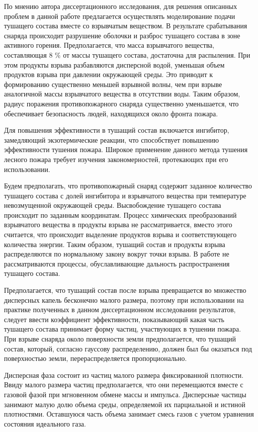 По мнению автора диссертационного исследования, для решения описанных проблем в данной работе предлагается
осуществлять моделирование подачи тушащего состава вместе со взрывчатым веществом.
В результате срабатывания снаряда происходит разрушение оболочки и разброс тушащего состава в зоне активного
горения.
Предполагается, что масса взрывчатого вещества, составляющая 8 \% от массы тушащего состава, достаточна для
распыления.
При этом продукты взрыва разбавляются дисперсной водой, уменьшая объем продуктов взрыва при давлении
окружающей среды.
Это приводит к формированию существенно меньшей взрывной волны, чем при взрыве аналогичной массы взрывчатого
вещества в отсутствии воды.
Таким образом, радиус поражения противопожарного снаряда существенно уменьшается, что обеспечивает безопасность людей,
находящихся около фронта пожара.

Для повышения эффективности в тушащий состав включается ингибитор, замедляющий экзотермические реакции, что
способствует повышению эффективности тушения пожара.
Широкое применение данного метода тушения лесного пожара требует изучения закономерностей, протекающих при его
использовании.

Будем предполагать, что противопожарный снаряд содержит заданное количество тушащего состава с долей ингибитора и
взрывчатого вещества при температуре невозмущенной окружающей среды.
Высвобождение тушащего состава происходит по заданным координатам.
Процесс химических преобразований взрывчатого вещества в продукты взрыва не рассматривается, вместо этого считается,
что происходит выделение продуктов взрыва и соответствующего количества энергии.
Таким образом, тушащий состав и продукты взрыва распределяются по нормальному закону вокруг точки взрыва.
В работе не рассматриваются процессы, обуславливающие дальность распространения тушащего состава.

Предполагается, что тушащий состав после взрыва превращается во множество дисперсных капель бесконечно малого
размера, поэтому при использовании на практике полученных в данном диссертационном исследовании результатов,
следует ввести коэффициент эффективности, показывающий какая часть тушащего состава принимает форму частиц,
участвующих в тушении пожара.
При взрыве снаряда около поверхности земли предполагается, что тушащий состав, который, согласно гауссову
распределению, должен был бы оказаться под поверхностью земли, перераспределяется пропорционально.

Дисперсная фаза состоит из частиц малого размера фиксированной плотности.
Ввиду малого размера частиц предполагается, что они перемещаются вместе с газовой фазой при мгновенном обмене массы
и импульса.
Дисперсные частицы занимают малую долю объема среды, определяемой их парциальной и истиной плотностями.
Оставшуюся часть объема занимает смесь газов с учетом уравнения состояния идеального газа.


